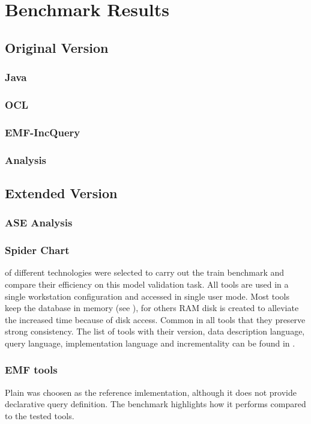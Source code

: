 \chapter{Benchmark Results}
\section{Original Version}
\subsection{Java}
\subsection{OCL}
\subsection{EMF-IncQuery}
\subsection{Analysis}


\section{Extended Version}
\subsection{ASE Analysis}
\subsection{Spider Chart}



 of different technologies were selected to carry out the train
benchmark and compare their efficiency on this model validation task.
All tools are used in a single workstation configuration and accessed in single
user mode. Most tools keep the database in memory (see ),
for others RAM disk is created to alleviate the increased time because of disk
access. Common in all tools that they preserve strong consistency. The list of
tools with their version, data description language, query language,
implementation language and incrementality can be found in .

\subsection{EMF tools}
Plain  was choosen as the reference imlementation, although it
does not provide declarative query definition. The benchmark highlights how it
performs compared to the tested tools.


